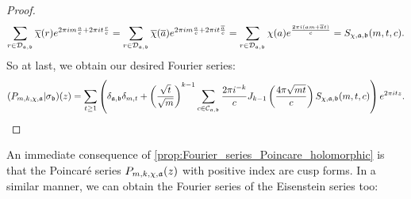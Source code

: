 \begin{proof}
      \[
        \sum_{r \in \mathcal{D}_{\mathfrak{a},\mathfrak{b}}}\overline{\chi}(r)e^{2\pi im\frac{a}{c}+2\pi it\frac{r}{c}} = \sum_{r \in \mathcal{D}_{\mathfrak{a},\mathfrak{b}}}\overline{\chi}(\overline{a})e^{2\pi im\frac{a}{c}+2\pi it\frac{\overline{a}}{c}} = \sum_{r \in \mathcal{D}_{\mathfrak{a},\mathfrak{b}}}\chi(a)e^{\frac{2\pi i(am+\overline{a}t)}{c}} = S_{\chi,\mathfrak{a},\mathfrak{b}}(m,t,c).
      \]
      So at last, we obtain our desired Fourier series:
      \[
        (P_{m,k,\chi,\mathfrak{a}}|\sigma_{\mathfrak{b}})(z) = \sum_{t \ge 1}\left(\delta_{\mathfrak{a},\mathfrak{b}}\delta_{m,t}+\left(\frac{\sqrt{t}}{\sqrt{m}}\right)^{k-1}\sum_{\substack{c \in \mathcal{C}_{\mathfrak{a},\mathfrak{b}}}}\frac{2\pi i^{-k}}{c}J_{k-1}\left(\frac{4\pi\sqrt{mt}}{c}\right)S_{\chi,\mathfrak{a},\mathfrak{b}}(m,t,c)\right)e^{2\pi itz}.
      \]
    \end{proof}

    An immediate consequence of \cref{prop:Fourier_series_Poincare_holomorphic} is that the Poincar\'e series $P_{m,k,\chi,\mathfrak{a}}(z)$ with positive index are cusp forms. In a similar manner, we can obtain the Fourier series of the Eisenstein series too:
    
